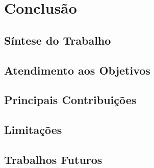 
\chapter{Conclusão}
\label{chap:conclusao}


\section{Síntese do Trabalho}
\label{sec:sintese-trabalho}


\section{Atendimento aos Objetivos}
\label{sec:conclusao-objetivos}


\section{Principais Contribuições}
\label{sec:contribuicoes}


\section{Limitações}
\label{sec:conclusao-limitacoes}


\section{Trabalhos Futuros}
\label{sec:trabalhos-futuros}


